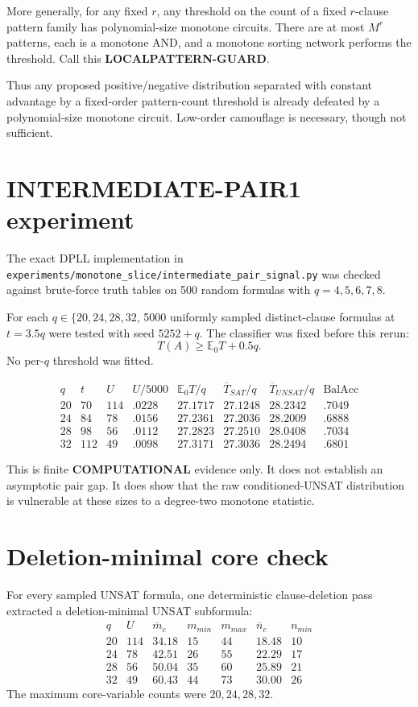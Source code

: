 \documentclass[11pt]{article}
\begin{document}
More generally, for any fixed \(r\), any threshold on the count of a fixed
\(r\)-clause pattern family has polynomial-size monotone circuits. There are
at most \(M^r\) patterns, each is a monotone AND, and a monotone sorting
network performs the threshold. Call this \textbf{LOCALPATTERN-GUARD}.

Thus any proposed positive/negative distribution separated with constant
advantage by a fixed-order pattern-count threshold is already defeated by a
polynomial-size monotone circuit. Low-order camouflage is necessary, though
not sufficient.

\section{INTERMEDIATE-PAIR1 experiment}
The exact DPLL implementation in
\texttt{experiments/monotone\_slice/intermediate\_pair\_signal.py} was checked
against brute-force truth tables on 500 random formulas with
\(q=4,5,6,7,8\).

For each \(q\in\{20,24,28,32\)\), 5000 uniformly sampled distinct-clause
formulas at \(t=3.5q\) were tested with seed \(5252+q\). The classifier was
fixed before this rerun:
\[
T(A)\ge \mathbb E_0T+0.5q.
\]
No per-\(q\) threshold was fitted.

\[
\begin{array}{c|c|c|c|c|c|c|c}
q&t&U&U/5000&\mathbb E_0T/q&\overline T_{SAT}/q&
\overline T_{UNSAT}/q&\mathrm{BalAcc}\\
\hline
20&70&114&.0228&27.1717&27.1248&28.2342&.7049\\
24&84&78&.0156&27.2361&27.2036&28.2009&.6888\\
28&98&56&.0112&27.2823&27.2510&28.0408&.7034\\
32&112&49&.0098&27.3171&27.3036&28.2494&.6801
\end{array}
\]

This is finite \textbf{COMPUTATIONAL} evidence only. It does not establish an
asymptotic pair gap. It does show that the raw conditioned-UNSAT distribution
is vulnerable at these sizes to a degree-two monotone statistic.

\section{Deletion-minimal core check}
For every sampled UNSAT formula, one deterministic clause-deletion pass
extracted a deletion-minimal UNSAT subformula:
\[
\begin{array}{c|c|c|c|c|c|c}
q&U&\overline m_c&m_{min}&m_{max}&\overline n_c&n_{min}\\
\hline
20&114&34.18&15&44&18.48&10\\
24&78&42.51&26&55&22.29&17\\
28&56&50.04&35&60&25.89&21\\
32&49&60.43&44&73&30.00&26
\end{array}
\]
The maximum core-variable counts were \(20,24,28,32\).
\end{document}
